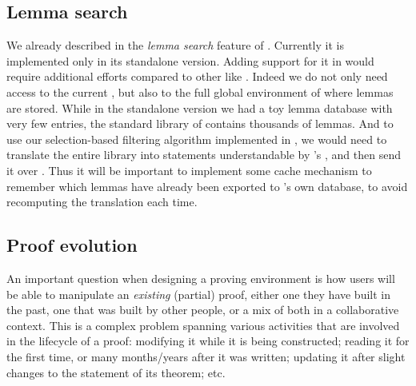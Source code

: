 \subsection{Lemma search}

We already described in  the \emph{lemma search} feature of
. Currently it is implemented only in its standalone version. Adding
support for it in  would require additional efforts compared to
other  like . Indeed we do not only need
access to the current , but also to the full global environment of
 where lemmas are stored. While in the standalone version we had a toy
lemma database with very few entries, the standard library of  contains
thousands of lemmas. And to use our selection-based filtering algorithm
implemented in , we would need to translate the entire library into
statements understandable by 's , and then send it
over . Thus it will be important to implement some cache mechanism to
remember which lemmas have already been exported to 's own database,
to avoid recomputing the translation each time.



\subsection{Proof evolution}

\AP
An important question when designing a proving environment is how users will be
able to manipulate an \emph{existing} (partial) proof, either one they have
built in the past, one that was built by other people, or a mix of both in a
collaborative context. This is a complex problem spanning various activities
that are involved in the lifecycle of a proof: modifying it while it is being
constructed; reading it for the first time, or many months/years after it was
written; updating it after slight changes to the statement of its theorem;
etc.

